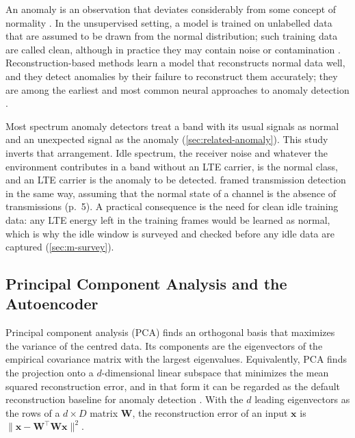 An anomaly is an observation that deviates considerably from some concept of normality \parencite{ruff2021}. In the unsupervised setting, a model is trained on unlabelled data that are assumed to be drawn from the normal distribution; such training data are called clean, although in practice they may contain noise or contamination \parencite{ruff2021}. Reconstruction-based methods learn a model that reconstructs normal data well, and they detect anomalies by their failure to reconstruct them accurately; they are among the earliest and most common neural approaches to anomaly detection \parencite{ruff2021}.

Most spectrum anomaly detectors treat a band with its usual signals as normal and an unexpected signal as the anomaly (\cref{sec:related-anomaly}). This study inverts that arrangement. Idle spectrum, the receiver noise and whatever the environment contributes in a band without an LTE carrier, is the normal class, and an LTE carrier is the anomaly to be detected. \Textcite{torio2025} framed transmission detection in the same way, assuming that the normal state of a channel is the absence of transmissions (p.~5). A practical consequence is the need for clean idle training data: any LTE energy left in the training frames would be learned as normal, which is why the idle window is surveyed and checked before any idle data are captured (\cref{sec:m-survey}).

\subsection{Principal Component Analysis and the Autoencoder}
\label{sec:ae-pca}

Principal component analysis (PCA) finds an orthogonal basis that maximizes the variance of the centred data. Its components are the eigenvectors of the empirical covariance matrix with the largest eigenvalues. Equivalently, PCA finds the projection onto a $d$-dimensional linear subspace that minimizes the mean squared reconstruction error, and in that form it can be regarded as the default reconstruction baseline for anomaly detection \parencite{ruff2021}. With the $d$ leading eigenvectors as the rows of a $d \times D$ matrix $\mathbf{W}$, the reconstruction error of an input $\mathbf{x}$ is $\lVert \mathbf{x} - \mathbf{W}^{\top}\mathbf{W}\mathbf{x} \rVert^2$.

